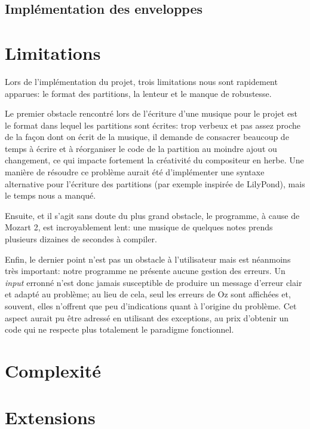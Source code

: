 \documentclass[a4paper,12pt]{article}
\begin{document}
\subsection{Implémentation des enveloppes}
\label{sec:impl_enveloppes}

\section{Limitations}

Lors de l'implémentation du projet, trois limitations nous sont rapidement apparues: le format des partitions, la lenteur et le manque de robustesse.

Le premier obstacle rencontré lors de l'écriture d'une musique pour le projet est le format dans lequel les partitions sont écrites: trop verbeux et pas assez proche de la façon dont on écrit de la musique, il demande de consacrer beaucoup de temps à écrire et à réorganiser le code de la partition au moindre ajout ou changement, ce qui impacte fortement la créativité du compositeur en herbe. Une manière de résoudre ce problème aurait été d'implémenter une syntaxe alternative pour l'écriture des partitions (par exemple inspirée de LilyPond\footnotemark), mais le temps nous a manqué.

Ensuite, et il s'agit sans doute du plus grand obstacle, le programme, à cause de Mozart 2, est incroyablement lent: une musique de quelques notes prends plusieurs dizaines de secondes à \og{}compiler\fg{}.

Enfin, le dernier point n'est pas un obstacle à l'utilisateur mais est néanmoins très important: notre programme ne présente aucune gestion des erreurs. Un \emph{input} erronné n'est donc jamais susceptible de produire un message d'erreur clair et adapté au problème; au lieu de cela, seul les erreurs de Oz sont affichées et, souvent, elles n'offrent que peu d'indications quant à l'origine du problème. Cet aspect aurait pu être adressé en utilisant des exceptions, au prix d'obtenir un code qui ne respecte plus totalement le paradigme fonctionnel.

\section{Complexité}

\section{Extensions}
\end{document}
